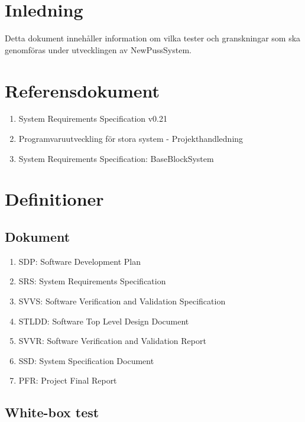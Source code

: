\documentclass[a4paper]{article}
\begin{document}
\section{Inledning}       

Detta dokument innehåller information om vilka tester och granskningar som ska genomföras under utvecklingen av NewPussSystem.

\section{Referensdokument}
\begin{enumerate}
\item System Requirements Specification v0.21
\item Programvaruutveckling för stora system - Projekthandledning
\item System Requirements Specification: BaseBlockSystem
\end{enumerate}

\section{Definitioner}

\subsection{Dokument}

\begin{enumerate}

\item SDP: Software Development Plan

\item SRS: System Requirements Specification

\item SVVS: Software Verification and Validation Specification

\item STLDD: Software Top Level Design Document

\item SVVR: Software Verification and Validation Report

\item SSD: System Specification Document

\item PFR: Project Final Report


\end{enumerate}

\subsection{White-box test}
\end{document}
